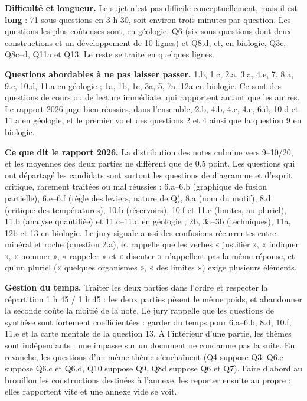 \documentclass[11pt,a4paper]{article}
\begin{document}
\textbf{Difficulté et longueur.} Le sujet n'est pas difficile conceptuellement, mais il est \textbf{long} : 71 sous-questions en 3 h 30, soit environ trois minutes par question. Les questions les plus coûteuses sont, en géologie, Q6 (six sous-questions dont deux constructions et un développement de 10 lignes) et Q8.d, et, en biologie, Q3c, Q8c--d, Q11a et Q13. Le reste se traite en quelques lignes.

\textbf{Questions abordables à ne pas laisser passer.} 1.b, 1.c, 2.a, 3.a, 4.e, 7, 8.a, 9.c, 10.d, 11.a en géologie ; 1a, 1b, 1c, 3a, 5, 7a, 12a en biologie. Ce sont des questions de cours ou de lecture immédiate, qui rapportent autant que les autres. Le rapport 2026 juge bien réussies, dans l'ensemble, 2.b, 4.b, 4.c, 4.e, 6.d, 10.d et 11.a en géologie, et le premier volet des questions 2 et 4 ainsi que la question 9 en biologie.

\textbf{Ce que dit le rapport 2026.} La distribution des notes culmine vers 9--10/20, et les moyennes des deux parties ne diffèrent que de 0,5 point. Les questions qui ont départagé les candidats sont surtout les questions de diagramme et d'esprit critique, rarement traitées ou mal réussies : 6.a--6.b (graphique de fusion partielle), 6.e--6.f (règle des leviers, nature de Q), 8.a (nom du motif), 8.d (critique des températures), 10.b (réservoirs), 10.f et 11.e (limites, au pluriel), 11.b (analyse quantifiée) et 11.c--11.d en géologie ; 2b, 3a--3b (techniques), 11a, 12b et 13 en biologie. Le jury signale aussi des confusions récurrentes entre minéral et roche (question 2.a), et rappelle que les verbes « justifier », « indiquer », « nommer », « rappeler » et « discuter » n'appellent pas la même réponse, et qu'un pluriel (« quelques organismes », « des limites ») exige plusieurs éléments.

\textbf{Gestion du temps.} Traiter les deux parties dans l'ordre et respecter la répartition 1 h 45 / 1 h 45 : les deux parties pèsent le même poids, et abandonner la seconde coûte la moitié de la note. Le jury rappelle que les questions de synthèse sont fortement coefficientées : garder du temps pour 6.a--6.b, 8.d, 10.f, 11.e et la carte mentale de la question 13. À l'intérieur d'une partie, les thèmes sont indépendants : une impasse sur un document ne condamne pas la suite. En revanche, les questions d'un même thème s'enchaînent (Q4 suppose Q3, Q6.e suppose Q6.c et Q6.d, Q10 suppose Q9, Q8d suppose Q6 et Q7). Faire d'abord au brouillon les constructions destinées à l'annexe, les reporter ensuite au propre : elles rapportent vite et une annexe vide se voit.
\end{document}
